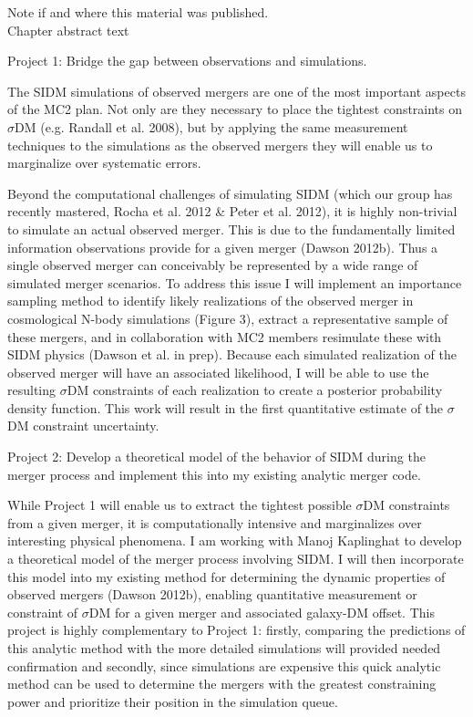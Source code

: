 \label{ch1}

\noindent Note if and where this material was published. \\

Chapter abstract text

Project 1: Bridge the gap between observations and simulations. 

The SIDM simulations of observed mergers are one of the most important aspects of the MC2 plan.  Not only are they necessary to place the tightest constraints on $\sigma$DM  (e.g. Randall et al. 2008), but by applying the same measurement techniques to the simulations as the observed mergers they will enable us to marginalize over systematic errors.  

Beyond the computational challenges of simulating SIDM (which our group has recently mastered, Rocha et al. 2012 \& Peter et al. 2012), it is highly non-trivial to simulate an actual observed merger. This is due to the fundamentally limited information observations provide for a given merger (Dawson 2012b). Thus a single observed merger can conceivably be represented by a wide range of simulated merger scenarios. To address this issue I will implement an importance sampling method to identify likely realizations of the observed merger in cosmological N-body simulations (Figure 3), extract a representative sample of these mergers, and in collaboration with MC2 members resimulate these with SIDM physics (Dawson et al. in prep).  Because each simulated realization of the observed merger will have an associated likelihood, I will be able to use the resulting $\sigma$DM  constraints of each realization to create a posterior probability density function.  This work will result in the first quantitative estimate of the $\sigma$DM  constraint uncertainty. 

Project 2: Develop a theoretical model of the behavior of SIDM during the merger process and implement this into my existing analytic merger code. 

While Project 1 will enable us to extract the tightest possible $\sigma$DM  constraints from a given merger, it is computationally intensive and marginalizes over interesting physical phenomena.  I am working with Manoj Kaplinghat to develop a theoretical model of the merger process involving SIDM.  I will then incorporate this model into my existing method for determining the dynamic properties of observed mergers (Dawson 2012b), enabling quantitative measurement or constraint of $\sigma$DM  for a given merger and associated galaxy-DM offset.  This project is highly complementary to Project 1: firstly, comparing the predictions of this analytic method with the more detailed simulations will provided needed confirmation and secondly, since simulations are expensive this quick analytic method can be used to determine the mergers with the greatest constraining power and prioritize their position in the simulation queue.

